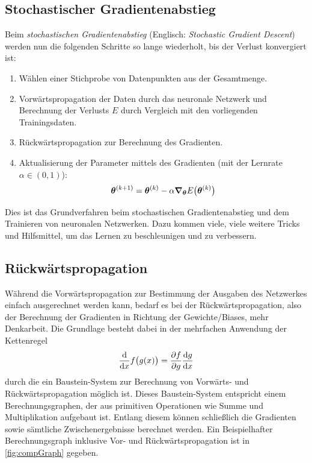 		\subsection{Stochastischer Gradientenabstieg}
			Beim \emph{stochastischen Gradientenabstieg} (Englisch: \emph{Stochastic Gradient Descent}) werden nun die folgenden Schritte so lange wiederholt, bis der Verlust konvergiert ist:
			\begin{enumerate}
				\item Wählen einer Stichprobe von Datenpunkten aus der Gesamtmenge.
				\item Vorwärtspropagation der Daten durch das neuronale Netzwerk und Berechnung der Verlusts \(E\) durch Vergleich mit den vorliegenden Trainingsdaten.
				\item Rückwärtspropagation zur Berechnung des Gradienten.
				\item Aktualisierung der Parameter mittels des Gradienten (mit der Lernrate \( \alpha \in (0, 1) \)):
					\begin{equation}
						\bm{\theta}^{(k + 1)} = \bm{\theta}^{(k)} - \alpha \grad_{\bm{\theta}}{E}\big(\bm{\theta}^{(k)}\big)
					\end{equation}
			\end{enumerate}
			Dies ist das Grundverfahren beim stochastischen Gradientenabstieg und dem Trainieren von neuronalen Netzwerken. Dazu kommen viele, viele weitere Tricks und Hilfsmittel, um das Lernen zu beschleunigen und zu verbessern.

		\subsection{Rückwärtspropagation}
			Während die Vorwärtspropagation zur Bestimmung der Ausgaben des Netzwerkes einfach ausgerechnet werden kann, bedarf es bei der Rückwärtspropagation, also der Berechnung der Gradienten in Richtung der Gewichte/Biases, mehr Denkarbeit. Die Grundlage besteht dabei in der mehrfachen Anwendung der Kettenregel
			\begin{equation}
				\dv{x} f\big( g(x) \big) = \pdv{f}{g} \dv{g}{x}
			\end{equation}
			durch die ein Baustein-System zur Berechnung von Vorwärts- und Rückwärtspropagation möglich ist. Dieses Baustein-System entspricht einem Berechnungsgraphen, der aus primitiven Operationen wie Summe und Multiplikation aufgebaut ist. Entlang diesem können schließlich die Gradienten sowie sämtliche Zwischenergebnisse berechnet werden. Ein Beispielhafter Berechnungsgraph inklusive Vor- und Rückwärtspropagation ist in \autoref{fig:compGraph} gegeben.

